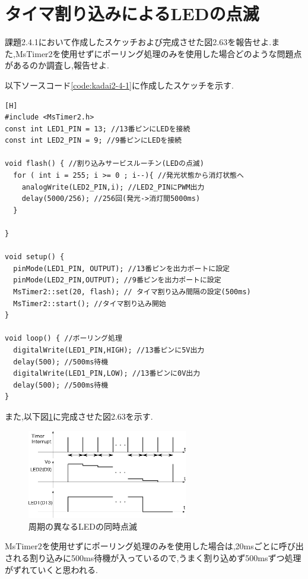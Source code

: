 \documentclass{jarticle}
\begin{document}
\section{タイマ割り込みによるLEDの点滅}
課題2.4.1において作成したスケッチおよび完成させた図2.63を報告せよ.また,MsTimer2を使用せずにポーリング処理のみを使用した場合どのような問題点があるのか調査し,報告せよ.

以下ソースコード\ref{code:kadai2-4-1}に作成したスケッチを示す.

\begin{lstlisting}[caption = 課題2.4.1,label=code:kadai2-4-1][H]
#include <MsTimer2.h>
const int LED1_PIN = 13; //13番ピンにLEDを接続
const int LED2_PIN = 9; //9番ピンにLEDを接続

void flash() { //割り込みサービスルーチン(LEDの点滅)
  for ( int i = 255; i >= 0 ; i--){ //発光状態から消灯状態へ
    analogWrite(LED2_PIN,i); //LED2_PINにPWM出力
    delay(5000/256); //256回(発光->消灯間5000ms)
  }
  
}

void setup() {
  pinMode(LED1_PIN, OUTPUT); //13番ピンを出力ポートに設定
  pinMode(LED2_PIN,OUTPUT); //9番ピンを出力ポートに設定
  MsTimer2::set(20, flash); // タイマ割り込み間隔の設定(500ms)
  MsTimer2::start(); //タイマ割り込み開始
}

void loop() { //ボーリング処理
  digitalWrite(LED1_PIN,HIGH); //13番ピンに5V出力
  delay(500); //500ms待機
  digitalWrite(LED1_PIN,LOW); //13番ピンに0V出力
  delay(500); //500ms待機
}
\end{lstlisting}

また,以下図\ref{fig:2-63}に完成させた図2.63を示す.

\begin{figure}[H]
\begin{center}
\includegraphics[width=7.0cm]{images/figure2-63.png}
\caption{周期の異なるLEDの同時点滅}
\label{fig:2-63}
\end{center}
\end{figure}

MsTimer2を使用せずにポーリング処理のみを使用した場合は,20msごとに呼び出される割り込みに500ms待機が入っているので,うまく割り込めず500msずつ処理がずれていくと思われる.
\end{document}
